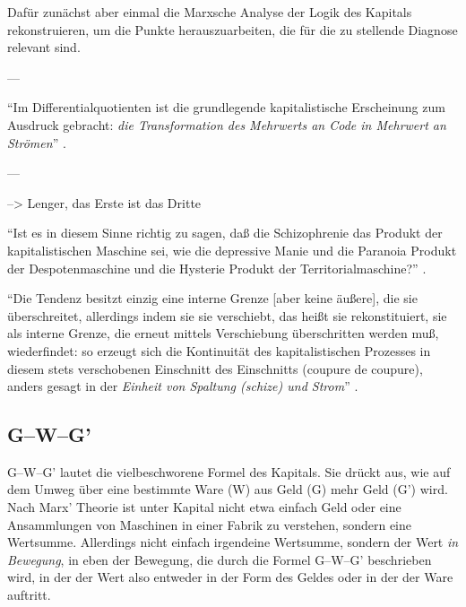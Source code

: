 \documentclass[12pt,
               DIV13,
               paper=a4,
               twoside=false,
               onehalfspacing,
               bibliography=totoc,
               toc=graduated,
               draft,
               ]{scrartcl}
\newcommand{\pc}[2]{\parencite[#1]{#2}}
\newcommand{\worries}[1]{\ifdraft{\textcolor{blue}{\texttt{(#1)}}}{}}
\newcommand{\gwg}{G--W--G'\xspace}
\begin{document}
Dafür zunächst aber einmal die Marxsche Analyse der Logik des Kapitals
rekonstruieren, um die Punkte herauszuarbeiten, die für die zu
stellende Diagnose relevant sind.

---

"`Im Differentialquotienten ist die grundlegende kapitalistische
Erscheinung zum Ausdruck gebracht: \emph{die Transformation des
Mehrwerts an Code in Mehrwert an Strömen}"' \pc{S. 292 f.}{ao}.

---

--> Lenger, das Erste ist das Dritte

"`Ist es in diesem Sinne richtig zu sagen, daß die Schizophrenie das
Produkt der kapitalistischen Maschine sei, wie die depressive Manie
und die Paranoia Produkt der Despotenmaschine und die Hysterie Produkt
der Territorialmaschine?"' \pc{44}{ao}.

"`Die Tendenz besitzt einzig eine interne Grenze [aber keine äußere],
die sie überschreitet, allerdings indem sie sie verschiebt, das heißt
sie rekonstituiert, sie als interne Grenze, die erneut mittels
Verschiebung überschritten \worries{Selbst-Überschreitung} werden muß,
wiederfindet: so erzeugt sich die Kontinuität des kapitalistischen
Prozesses in diesem stets verschobenen Einschnitt des Einschnitts
(coupure de coupure), anders gesagt in der \emph{Einheit von Spaltung
(schize) und Strom}"' \pc{S. 296, meine Hervorh.}{ao}.



\subsection{\gwg}

\gwg lautet die vielbeschworene Formel des Kapitals. Sie drückt aus,
wie auf dem Umweg über eine bestimmte Ware (W) aus Geld (G) mehr Geld
(G') wird. Nach Marx' Theorie ist unter Kapital nicht etwa einfach
Geld oder eine Ansammlungen von Maschinen in einer Fabrik zu
verstehen, sondern eine Wertsumme. Allerdings nicht einfach irgendeine
Wertsumme, sondern der Wert \emph{in Bewegung}, in eben der Bewegung,
die durch die Formel \gwg beschrieben wird, in der der Wert also
entweder in der Form des Geldes oder in der der Ware auftritt.


\end{document}
